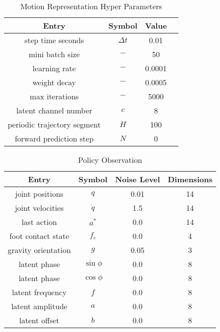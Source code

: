 \begin{table}[t]
\caption{Motion Representation Hyper Parameters}
\label{table:fld_param}
\begin{center}
\begin{tabular}{cccc}
\toprule
\textbf{Entry} & \textbf{Symbol} & \textbf{Value} \\
\midrule
step time seconds & $\Delta t$ & 0.01 \\
mini batch size & ${-}$ & 50 \\
learning rate & ${-}$ & 0.0001 \\
weight decay & ${-}$ & 0.0005 \\
max iterations & ${-}$ & 5000 \\
latent channel number & ${c}$ & 8 \\
periodic trajectory segment  & ${H}$ & 100 \\
forward prediction step & ${N}$ & 0  \\
\bottomrule
\end{tabular}
\end{center}
\end{table}

\begin{table}
\caption{Policy Observation}
\label{table:observation}
\begin{center}
\begin{tabular}{cccc}
\toprule
\textbf{Entry} & \textbf{Symbol} & \textbf{Noise Level} & \textbf{Dimensions} \\
\midrule
joint positions & ${q}$ & 0.01 & 14 \\
joint velocities & ${\dot{q}}$ & 1.5 & 14  \\
last action & ${a}^*$ & 0.0 & 14 \\
foot contact state & ${f_c}$ & 0.0 & 4 \\
gravity orientation & ${g}$ & 0.05 & 3 \\
latent phase & ${\sin{\phi}}$ & 0.0 & 8 \\
latent phase & ${\cos{\phi}}$ & 0.0 & 8 \\
latent frequency & ${f}$ & 0.0 & 8 \\
latent amplitude & ${a}$ & 0.0 & 8 \\
latent offset & ${b}$ & 0.0  & 8\\
\bottomrule
\end{tabular}
\end{center}
\end{table}

